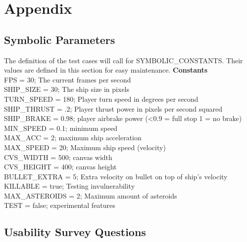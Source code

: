 \documentclass[12pt, titlepage]{article}
\begin{document}


\newpage

\section{Appendix}


\subsection{Symbolic Parameters}

The definition of the test cases will call for SYMBOLIC\_CONSTANTS.
Their values are defined in this section for easy maintenance.
\textbf{Constants}\\
FPS = 30; The current frames per second\\
SHIP\_SIZE = 30; The ship size in pixels\\
TURN\_SPEED = 180; Player turn speed in degrees per second\\
SHIP\_THRUST = .2; Player thrust power in pixels per second squared \\
SHIP\_BRAKE = 0.98; player airbrake power (<0.9 = full stop 1 = no brake) \\
MIN\_SPEED = 0.1; minimum speed \\
MAX\_ACC = 2; maximum ship acceleration \\
MAX\_SPEED = 20; Maximum ship speed (velocity) \\
CVS\_WIDTH = 500; canvas width \\
CVS\_HEIGHT = 400; canvas height \\
BULLET\_EXTRA = 5; Extra velocity on bullet on top of ship's velocity \\
KILLABLE = true; Testing invulnerability \\
MAX\_ASTEROIDS = 2; Maximum amount of asteroids \\
TEST = false; experimental features \\


\subsection{Usability Survey Questions}
\label{interview:questions}
\end{document}
